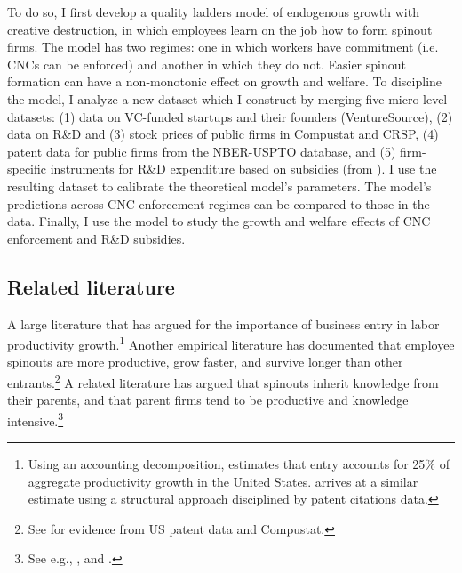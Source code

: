 \documentclass[11pt,english]{article}
\theoremstyle{remark}
\begin{document}
To do so, I first develop a quality ladders model of endogenous growth with creative destruction, in which employees learn on the job how to form spinout firms. The model has two regimes: one in which workers have commitment (i.e. CNCs can be enforced) and another in which they do not. Easier spinout formation can have a non-monotonic effect on growth and welfare. To discipline the model, I analyze a new dataset which I construct by merging five micro-level datasets: (1)  data on VC-funded startups and their founders (VentureSource), (2) data on R\&D and (3) stock prices of public firms in Compustat and CRSP, (4) patent data for public firms from the NBER-USPTO database, and (5) firm-specific instruments for R\&D expenditure based on subsidies (from  \cite{bloom_identifying_2013}). I use the resulting dataset to calibrate the theoretical model's parameters. The model's predictions across CNC enforcement regimes can be compared to those in the data. Finally, I use the model to study the growth and welfare effects of CNC enforcement and R\&D subsidies.

\subsection*{Related literature}

A large literature that has argued for the importance of business entry in labor productivity growth.\footnote{Using an accounting decomposition, \cite{foster_aggregate_2001} estimates that entry accounts for 25\% of aggregate productivity growth in the United States. \cite{akcigit_growth_2018} arrives at a similar estimate using a structural approach disciplined by patent citations data.} Another empirical literature has documented that employee spinouts are more productive, grow faster, and survive longer than other entrants.\footnote{See \cite{baslandze_spinout_2019} for evidence from US patent data and Compustat.} A related literature has argued that spinouts inherit knowledge from their parents, and that parent firms tend to be productive and knowledge intensive.\footnote{See e.g., \cite{gompers_entrepreneurial_2005}, and \cite{baslandze_spinout_2019}.} 
\end{document}
